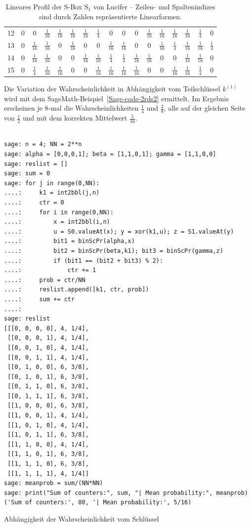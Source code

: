 \begin{refsegment}
\begin{table}
\begin{center}
\begin{tabular}{|c|cccccccccccccccc|}
12&0&0&$\frac{1}{16}$&$\frac{1}{16}$&$\frac{1}{16}$&$\frac{1}{16}$&$\frac{1}{4}$&0&0&0&$\frac{1}{16}$&$\frac{1}{16}$&$\frac{1}{16}$&$\frac{1}{16}$&$\frac{1}{4}$&0\\
13&0&$\frac{1}{16}$&$\frac{1}{16}$&0&$\frac{1}{16}$&0&0&$\frac{1}{16}$&$\frac{1}{16}$&0&0&$\frac{1}{16}$&$\frac{1}{4}$&$\frac{1}{16}$&$\frac{1}{16}$&$\frac{1}{4}$\\
14&0&$\frac{1}{16}$&$\frac{1}{16}$&0&0&$\frac{1}{16}$&$\frac{1}{16}$&$\frac{1}{4}$&$\frac{1}{4}$&$\frac{1}{16}$&$\frac{1}{16}$&0&0&$\frac{1}{16}$&$\frac{1}{16}$&0\\
15&0&$\frac{1}{4}$&$\frac{1}{16}$&$\frac{1}{16}$&0&0&$\frac{1}{16}$&$\frac{1}{16}$&$\frac{1}{16}$&$\frac{1}{16}$&0&0&$\frac{1}{16}$&$\frac{1}{16}$&$\frac{1}{4}$&0\\
\hline
\end{tabular}
\end{center}\caption{Lineares Profil der S-Box $\mathrm{S}_1$ von {\sc Lucifer} --
   Zeilen- und Spaltenindizes sind durch Zahlen repräsentierte Linearformen.}\label{tab-bool-lp1}
\end{table}

Die Variation der Wahrscheinlichkeit in Abhängigkeit vom Teilschlüssel
$k^{(1)}$ wird mit dem SageMath-Beispiel~\ref{Sage-code-2rds2} ermittelt. Im
Ergebnis erscheinen je 8-mal die Wahrscheinlichkeiten $\frac{1}{4}$
und $\frac{3}{8}$, alle auf der gleichen Seite von $\frac{1}{2}$ und
mit dem korrekten Mittelwert $\frac{5}{16}$.

\begin{sagecode}
\begin{verbatim}

sage: n = 4; NN = 2**n
sage: alpha = [0,0,0,1]; beta = [1,1,0,1]; gamma = [1,1,0,0]
sage: reslist = []
sage: sum = 0
sage: for j in range(0,NN):
....:     k1 = int2bbl(j,n)
....:     ctr = 0
....:     for i in range(0,NN):
....:         x = int2bbl(i,n)
....:         u = S0.valueAt(x); y = xor(k1,u); z = S1.valueAt(y)
....:         bit1 = binScPr(alpha,x)
....:         bit2 = binScPr(beta,k1); bit3 = binScPr(gamma,z)
....:         if (bit1 == (bit2 + bit3) % 2):
....:             ctr += 1
....:     prob = ctr/NN
....:     reslist.append([k1, ctr, prob])
....:     sum += ctr
....:
sage: reslist
[[[0, 0, 0, 0], 4, 1/4],
 [[0, 0, 0, 1], 4, 1/4],
 [[0, 0, 1, 0], 4, 1/4],
 [[0, 0, 1, 1], 4, 1/4],
 [[0, 1, 0, 0], 6, 3/8],
 [[0, 1, 0, 1], 6, 3/8],
 [[0, 1, 1, 0], 6, 3/8],
 [[0, 1, 1, 1], 6, 3/8],
 [[1, 0, 0, 0], 6, 3/8],
 [[1, 0, 0, 1], 4, 1/4],
 [[1, 0, 1, 0], 4, 1/4],
 [[1, 0, 1, 1], 6, 3/8],
 [[1, 1, 0, 0], 4, 1/4],
 [[1, 1, 0, 1], 6, 3/8],
 [[1, 1, 1, 0], 6, 3/8],
 [[1, 1, 1, 1], 4, 1/4]]
sage: meanprob = sum/(NN*NN)
sage: print("Sum of counters:", sum, "| Mean probability:", meanprob)
('Sum of counters:', 80, '| Mean probability:', 5/16)
\end{verbatim}
\caption{Abhängigkeit der Wahrscheinlichkeit vom Schlüssel}\label{Sage-code-2rds2}
\end{sagecode}


\end{refsegment}
